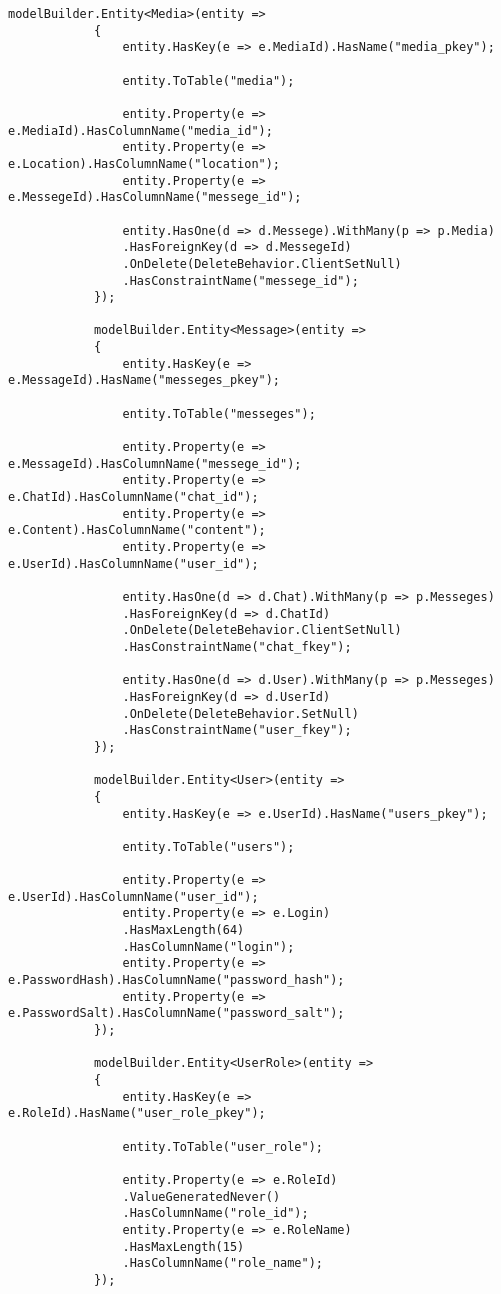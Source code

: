 \begin{lstlisting}[style=c#]
			modelBuilder.Entity<Media>(entity =>
			{
				entity.HasKey(e => e.MediaId).HasName("media_pkey");
				
				entity.ToTable("media");
				
				entity.Property(e => e.MediaId).HasColumnName("media_id");
				entity.Property(e => e.Location).HasColumnName("location");
				entity.Property(e => e.MessegeId).HasColumnName("messege_id");
				
				entity.HasOne(d => d.Messege).WithMany(p => p.Media)
				.HasForeignKey(d => d.MessegeId)
				.OnDelete(DeleteBehavior.ClientSetNull)
				.HasConstraintName("messege_id");
			});
			
			modelBuilder.Entity<Message>(entity =>
			{
				entity.HasKey(e => e.MessageId).HasName("messeges_pkey");
				
				entity.ToTable("messeges");
				
				entity.Property(e => e.MessageId).HasColumnName("messege_id");
				entity.Property(e => e.ChatId).HasColumnName("chat_id");
				entity.Property(e => e.Content).HasColumnName("content");
				entity.Property(e => e.UserId).HasColumnName("user_id");
				
				entity.HasOne(d => d.Chat).WithMany(p => p.Messeges)
				.HasForeignKey(d => d.ChatId)
				.OnDelete(DeleteBehavior.ClientSetNull)
				.HasConstraintName("chat_fkey");
				
				entity.HasOne(d => d.User).WithMany(p => p.Messeges)
				.HasForeignKey(d => d.UserId)
				.OnDelete(DeleteBehavior.SetNull)
				.HasConstraintName("user_fkey");
			});
			
			modelBuilder.Entity<User>(entity =>
			{
				entity.HasKey(e => e.UserId).HasName("users_pkey");
				
				entity.ToTable("users");
				
				entity.Property(e => e.UserId).HasColumnName("user_id");
				entity.Property(e => e.Login)
				.HasMaxLength(64)
				.HasColumnName("login");
				entity.Property(e => e.PasswordHash).HasColumnName("password_hash");
				entity.Property(e => e.PasswordSalt).HasColumnName("password_salt");
			});
			
			modelBuilder.Entity<UserRole>(entity =>
			{
				entity.HasKey(e => e.RoleId).HasName("user_role_pkey");
				
				entity.ToTable("user_role");
				
				entity.Property(e => e.RoleId)
				.ValueGeneratedNever()
				.HasColumnName("role_id");
				entity.Property(e => e.RoleName)
				.HasMaxLength(15)
				.HasColumnName("role_name");
			});
			

\end{lstlisting}
